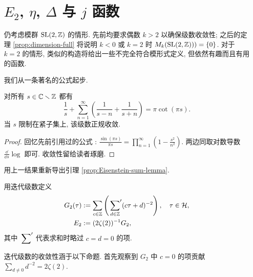 \section{\texorpdfstring{$E_2$}{E2}, \texorpdfstring{$\eta$}{eta}, \texorpdfstring{$\Delta$}{Delta} 与 \texorpdfstring{$j$}{j} 函数}\label{sec:j-invariant}
仍考虑模群 $\operatorname{SL}(2,\mathbb{Z})$ 的情形. 先前均要求偶数 $k > 2$ 以确保级数收敛性; 之后的定理 \ref{prop:dimension-full} 将说明 $k < 0$ 或 $k = 2$ 时 $M_k(\operatorname{SL}(2,\mathbb{Z}))) = \{0\}$. 对于 $k=2$ 的情形, 类似的构造将给出一些不完全符合模形式定义, 但依然有趣而且有用的函数.

我们从一条著名的公式起步.
\begin{lemma}\label{prop:cot-formula}
	对所有 $s \in \mathbb{C} \smallsetminus \mathbb{Z}$ 都有
	\[ \frac{1}{s} + \sum_{n=1}^\infty \left(\frac{1}{s - n} + \frac{1}{s + n}\right) = \pi \cot(\pi s). \]
	当 $s$ 限制在紧子集上, 该级数正规收敛.
\end{lemma}
\begin{proof}
	回忆先前引用过的公式 \cite[\S 1.7 (3)]{GW}: $\frac{\sin(\pi s)}{\pi s} = \prod_{n=1}^\infty \left( 1 - \frac{s^2}{n^2} \right)$. 两边同取对数导数 $\frac{\dd}{\dd s} \log$ 即可. 收敛性留给读者琢磨.
\end{proof}

\begin{exercise}
	用上一结果重新导出引理 \ref{prop:Eisenstein-sum-lemma}.
\end{exercise}

\begin{definition}\label{def:E2}  
	用迭代级数定义 
	\begin{align*}
		G_2(\tau) & := \sum_{c \in \mathbb{Z}} \left( \sideset{}{'}\sum_{d \in \mathbb{Z}} (c\tau + d)^{-2}\right), \quad \tau \in \mathcal{H}, \\
		E_2 & := (2\zeta(2))^{-1} G_2,
	\end{align*}
	其中 $\sideset{}{'}\sum$ 代表求和时略过 $c=d=0$ 的项.
\end{definition}
迭代级数的收敛性涵于以下命题. 首先观察到 $G_2$ 中 $c=0$ 的项贡献 $\sum_{d \neq 0} d^{-2} = 2\zeta(2)$. 

